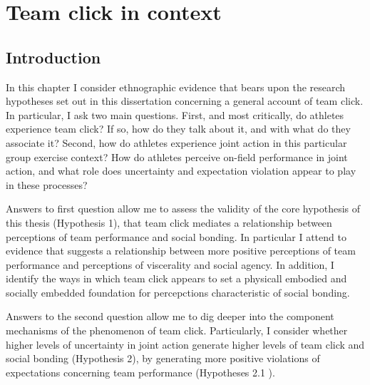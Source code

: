
\begin{savequote}[8cm]

  \qauthor{}
\end{savequote}



\chapter{Team click in context \label{chap:ethnoResults}}

\minitoc






                                      \begin{CJK}{UTF8}{gbsn}


\section{Introduction}

In this chapter I consider ethnographic evidence that bears upon the research hypotheses set out in this dissertation concerning a general account of team click.  In particular, I ask two main questions.  First, and most critically, do athletes experience team click? If so, how do they talk about it, and with what do they associate it?  Second, how do athletes experience joint action in this particular group exercise context?  How do athletes perceive on-field performance in joint action, and what role does uncertainty and expectation violation appear to play in these processes?

Answers to first question allow me to assess the validity of the core hypothesis of this thesis (Hypothesis 1), that team click mediates a relationship between perceptions of team performance and social bonding. In particular I attend to evidence that suggests a relationship between more positive perceptions of team performance and perceptions of viscerality and social agency. In addition, I identify the ways in which team click appears to set a physicall embodied and socially embedded foundation for percepctions characteristic of social bonding.

Answers to the second question allow me to dig deeper into the component mechanisms of the phenomenon of team click.  Particularly, I consider whether higher levels of uncertainty in joint action generate higher levels of team click and social bonding (Hypothesis 2), by generating more positive violations of expectations concerning team performance (Hypotheses 2.1 ).


\end{CJK}
